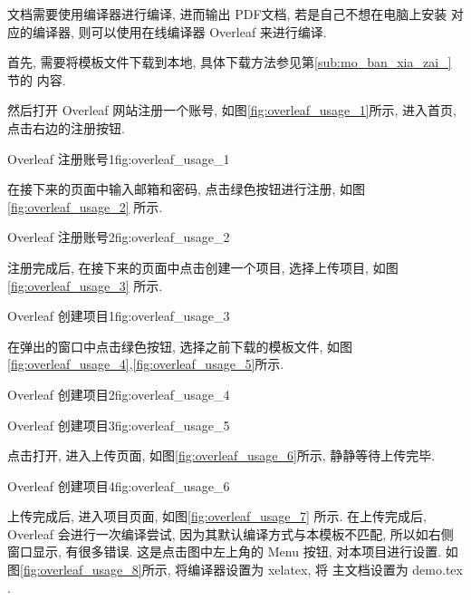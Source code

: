 \documentclass[bibsec, doctor]{cugthesis}
\begin{document}
\LaTeXe{} 文档需要使用编译器进行编译, 进而输出 PDF文档, 若是自己不想在电脑上安装
对应的编译器, 则可以使用在线编译器 Overleaf 来进行编译.

首先, 需要将模板文件下载到本地, 具体下载方法参见第\ref{sub:mo_ban_xia_zai_} 节的
内容.

然后打开 Overleaf 网站注册一个账号, 如图\ref{fig:overleaf_usage_1}所示,
进入首页, 点击右边的注册按钮.

\begin{tfig}{Overleaf 注册账号1}{fig:overleaf_usage_1}
\end{tfig}

在接下来的页面中输入邮箱和密码, 点击绿色按钮进行注册,
如图\ref{fig:overleaf_usage_2} 所示.

\begin{tfig}{Overleaf 注册账号2}{fig:overleaf_usage_2}
\end{tfig}

注册完成后, 在接下来的页面中点击创建一个项目, 选择上传项目,
如图\ref{fig:overleaf_usage_3} 所示.

\begin{tfig}{Overleaf  创建项目1}{fig:overleaf_usage_3}
\end{tfig}

在弹出的窗口中点击绿色按钮, 选择之前下载的模板文件,
如图\ref{fig:overleaf_usage_4},\ref{fig:overleaf_usage_5}所示.

\begin{tfig}{Overleaf  创建项目2}{fig:overleaf_usage_4}
\end{tfig}

\begin{tfig}{Overleaf  创建项目3}{fig:overleaf_usage_5}
\end{tfig}

点击打开, 进入上传页面, 如图\ref{fig:overleaf_usage_6}所示, 静静等待上传完毕.

\begin{tfig}{Overleaf  创建项目4}{fig:overleaf_usage_6}
\end{tfig}

上传完成后, 进入项目页面, 如图\ref{fig:overleaf_usage_7} 所示. 在上传完成后,
Overleaf 会进行一次编译尝试, 因为其默认编译方式与本模板不匹配,
所以如右侧窗口显示, 有很多错误. 这是点击图中左上角的 Menu 按钮,
对本项目进行设置. 如图\ref{fig:overleaf_usage_8}所示, 将编译器设置为 xelatex, 将
主文档设置为 demo.tex .
\end{document}
